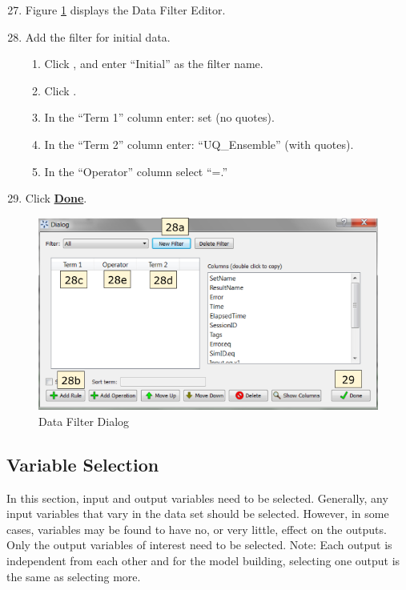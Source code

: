 \begin{enumerate}
	\setcounter{enumi}{26}
	\item Figure \ref{fig.tut.sur.dataFilter} displays the Data Filter Editor. 
	\item Add the filter for initial data.
	\begin{enumerate}
		\item Click , and enter ``Initial'' as the filter name.
		\item Click .
		\item In the ``Term 1'' column enter: set (no quotes).
		\item In the ``Term 2'' column enter: ``UQ\_Ensemble'' (with quotes).
		\item In the ``Operator'' column select ``=.''	
	\end{enumerate}
	\item Click \textbf{\underline{Done}}.
\end{enumerate}
\begin{figure}[H]
	\begin{center}
		\includegraphics[scale=0.55]{Chapt_surrogates/figs/dataFilter}
		\caption{Data Filter Dialog}
		\label{fig.tut.sur.dataFilter}
	\end{center}
\end{figure}

\subsection{Variable Selection}
In this section, input and output variables need to be selected. Generally, any input variables that vary in the data set should be selected. However, in some cases, variables may be found to have no, or very little, effect on the outputs. Only the output variables of interest need to be selected. Note: Each output is independent from each other and for the model building, selecting one output is the same as selecting more.

